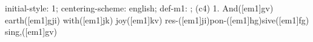 initial-style: 1;
centering-scheme: english;
def-m1: \grealign;
(c4) 1. And([em1]gv) earth([em1]gji) with([em1]jk) joy([em1]kv) res-([em1]ji)pon-([em1]hg)sive([em1]fg) sing,([em1]gv)